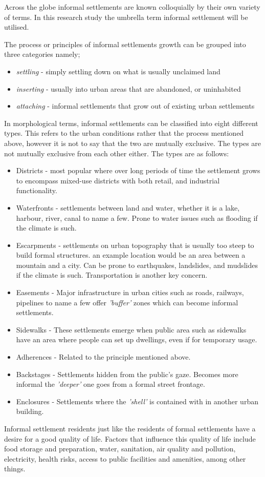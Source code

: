 Across the globe informal settlements are known colloquially by their own variety of terms\citep{un}. In this research study the umbrella term informal settlement will be utilised.

The process or principles of informal settlements growth can be grouped into three categories namely;\citep{dovey2011forms}
\begin{itemize}
\item \textsl{settling} - simply settling down on what is usually unclaimed land
\item \textsl{inserting} - usually into urban areas that are abandoned, or uninhabited
\item \textsl{attaching} - informal settlements that grow out of existing urban settlements
\end{itemize}
In morphological terms, informal settlements can be classified into eight different types. This refers to the urban conditions rather that the process mentioned above, however it is not to say that the two are mutually exclusive. The types are not mutually exclusive from each other either. The types are as follows:\citep{dovey2011forms}
\begin{itemize}
\item Districts - most popular where over long periods of time the settlement grows to encompass mixed-use districts with both retail, and industrial functionality.
\item Waterfronts - settlements between land and water, whether it is a lake, harbour, river, canal to name a few. Prone to water issues such as flooding if the climate is such.
\item Escarpments - settlements on urban topography that is usually too steep to build formal structures. an example location would be an area between a mountain and a city. Can be prone to earthquakes, landslides, and mudslides if the climate is such. Transportation is another key concern.
\item Easements - Major infrastructure in urban cities such as roads, railways, pipelines to name a few offer \textsl{'buffer'} zones which can become informal settlements.
\item Sidewalks - These settlements emerge when public area such as sidewalks have an area where people can set up dwellings, even if for temporary usage.
\item Adherences - Related to the principle mentioned above.
\item Backstages - Settlements hidden from the public's gaze. Becomes more informal the \textsl{'deeper'} one goes from a formal street frontage.
\item Enclosures - Settlements where the \textsl{'shell'} is contained with in another urban building.
\end{itemize}
Informal settlement residents just like the residents of formal settlements have a desire for a good quality of life. Factors that influence this quality of life include food storage and preparation, water, sanitation, air quality and pollution, electricity, health risks, access to public facilities and amenities, among other things\citep{richards2007measuring}.

